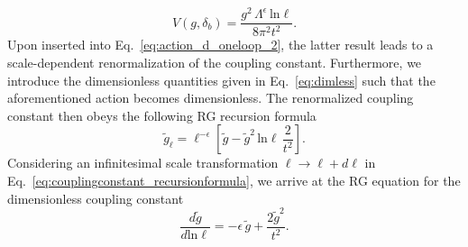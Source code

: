\documentclass[reprint,floatfix, twocolumn]{revtex4-1}
\begin{document}
\begin{equation}
	V(g,\delta_b)=\dfrac{g^2\,\Lambda^\epsilon\,\text{ln}\ell}{8\pi^2t^2}.
\end{equation}
Upon inserted into Eq.~\eqref{eq:action_d_oneloop_2}, the latter result leads to a scale-dependent renormalization of the coupling constant. Furthermore, we introduce the dimensionless quantities given in Eq.~\eqref{eq:dimless} such that the aforementioned action becomes dimensionless. The renormalized coupling constant then obeys the following RG recursion formula
\begin{equation}\label{eq:couplingconstant_recursionformula}
	\widetilde{g}_\ell=\ell^{-\epsilon}\left[\widetilde{g}-\widetilde{g}^2\,\text{ln}\ell\,\dfrac{2}{t^2}\right].
\end{equation}
Considering an infinitesimal scale transformation $\ell\to\ell+d\ell$ in Eq.~\eqref{eq:couplingconstant_recursionformula}, we arrive at the RG equation for the dimensionless coupling constant
\begin{equation}
\dfrac{d\widetilde{g}}{d\text{ln}\ell}=-\epsilon\,\widetilde{g} +\dfrac{2\widetilde{g}^2}{t^2}.
\end{equation}
\end{document}
